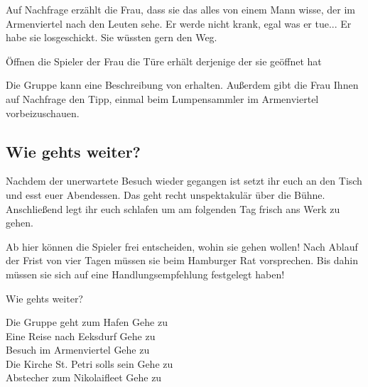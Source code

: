Auf Nachfrage erzählt die Frau, dass sie das alles von einem Mann wisse, der im
Armenviertel nach den Leuten sehe. Er werde nicht krank, egal was er tue...
Er habe sie losgeschickt. Sie wüssten gern den Weg.

\begin{info-box}

Öffnen die Spieler der Frau die Türe erhält derjenige der sie geöffnet hat

Die Gruppe kann eine Beschreibung von  erhalten. Außerdem gibt
die Frau Ihnen auf Nachfrage den Tipp, einmal beim Lumpensammler im Armenviertel
vorbeizuschauen.

\end{info-box}

\subsection{Wie gehts weiter?}
\label{ssec:kapelle-ende}

Nachdem der unerwartete Besuch wieder gegangen ist setzt ihr euch an den Tisch
und esst euer Abendessen. Das geht recht unspektakulär über die Bühne. Anschließend
legt ihr euch schlafen um am folgenden Tag frisch ans Werk zu gehen.

\begin{info-box}

Ab hier können die Spieler frei entscheiden, wohin sie gehen wollen! Nach Ablauf
der Frist von vier Tagen müssen sie beim Hamburger Rat vorsprechen. Bis dahin
müssen sie sich auf eine Handlungsempfehlung festgelegt haben!

\end{info-box}

\begin{ref-box}{Wie gehts weiter?}

Die Gruppe geht zum Hafen \then Gehe zu  \\
Eine Reise nach Eeksdurf \then Gehe zu  \\
Besuch im Armenviertel \then Gehe zu  \\
Die Kirche St. Petri solls sein \then Gehe zu  \\
Abstecher zum Nikolaifleet \then Gehe zu 

\end{ref-box}
